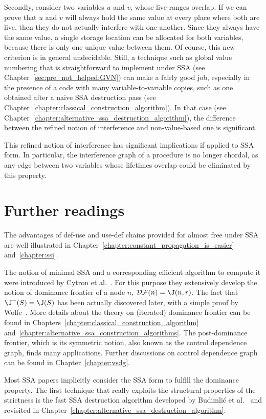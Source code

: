 Secondly, consider two variables $u$ and $v$, whose live-ranges overlap. 
If we can prove that $u$ and $v$ will always hold the same value at every place where both are live, then they do not actually interfere with one another. 
Since they always have the same value, a single storage location can be allocated for both variables, because there is only one unique value between them. 
Of course, this new criterion is in general undecidable. 
Still, a technique such as global value numbering that is straightforward to implement under SSA (see Chapter~\ref{sec:pre_not_helped:GVN}) can make a fairly good job, especially in the presence of a code with many variable-to-variable copies, such as one obtained after a naive SSA destruction pass (see Chapter~\ref{chapter:classical_construction_algorithm}). 
In that case (see Chapter~\ref{chapter:alternative_ssa_destruction_algorithm}), the difference between the refined notion of interference and non-value-based one is significant.

This refined notion of interference has significant implications if applied to SSA form. 
In particular, the interference graph of a procedure is no longer chordal, as any edge between two variables whose lifetimes overlap could be eliminated by this property.


\section{Further readings}
The advantages of def-use and use-def chains provided for almost free under SSA are well illustrated in Chapter\ifconstantprop~\ref{chapter:constant_propagation_is_easier} and\fi~\ref{chapter:ssi}.

The notion of minimal SSA and a corresponding efficient algorithm to compute it were introduced by Cytron et al.~\cite{Cytron:1991:TOPLAS}. 
For this purpose they extensively develop the notion of dominance frontier of a node $n$, ${\cal DF}(n)=\J(n,r)$. 
The fact that $\J^+(S)=\J(S)$ has been actually discovered later, with a simple proof by Wolfe~\cite{WolfeJul94}. 
More details about the theory on (iterated) dominance frontier can be found in Chapters~\ref{chapter:classical_construction_algorithm} and~\ref{chapter:alternative_ssa_construction_algorithms}. 
The post-dominance frontier, which is its symmetric notion, also known as the control dependence graph, finds many applications. 
Further discussions on control dependence graph can be found in Chapter~\ref{chapter:vsdg}.

Most SSA papers implicitly consider the SSA form to fulfill the dominance property. 
The first technique that really exploits the structural properties of the strictness is the fast SSA destruction algorithm developed by Budimli\'c et al.~\cite{Budimlic02} and revisited in Chapter~\ref{chapter:alternative_ssa_destruction_algorithm}.

